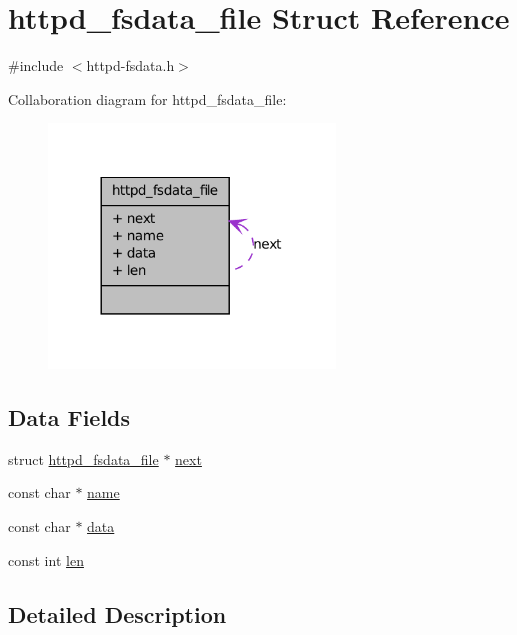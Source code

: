 \hypertarget{structhttpd__fsdata__file}{
\section{httpd\_\-fsdata\_\-file Struct Reference}
\label{structhttpd__fsdata__file}
}


{\ttfamily \#include $<$httpd-\/fsdata.h$>$}



Collaboration diagram for httpd\_\-fsdata\_\-file:
\nopagebreak
\begin{figure}[H]
\begin{center}
\leavevmode
\includegraphics[width=216pt]{structhttpd__fsdata__file__coll__graph}
\end{center}
\end{figure}
\subsection*{Data Fields}
\begin{DoxyCompactItemize}
\item 
struct \hyperlink{structhttpd__fsdata__file}{httpd\_\-fsdata\_\-file} $\ast$ \hyperlink{structhttpd__fsdata__file_aaf8a286e2347fb88a421dc37e0382bf6}{next}
\item 
const char $\ast$ \hyperlink{structhttpd__fsdata__file_a2bd77050e4f4c6b7545fa810f33ed288}{name}
\item 
const char $\ast$ \hyperlink{structhttpd__fsdata__file_ad467af3dd982835f28549340baf45cbe}{data}
\item 
const int \hyperlink{structhttpd__fsdata__file_a6b6ff8657c9131e01ed0afb7024c7932}{len}
\end{DoxyCompactItemize}


\subsection{Detailed Description}


